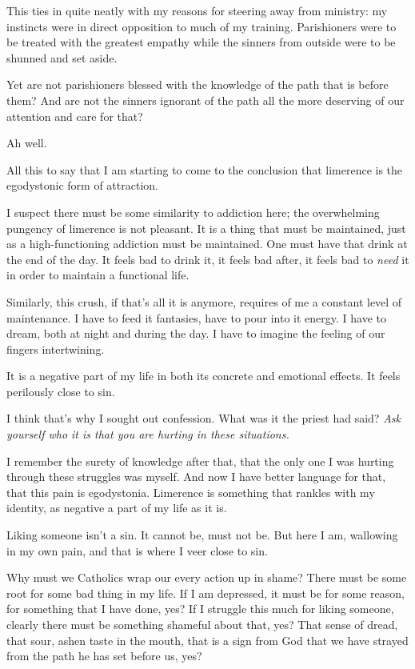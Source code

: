 This ties in quite neatly with my reasons for steering away from ministry: my instincts were in direct opposition to much of my training. Parishioners were to be treated with the greatest empathy while the sinners from outside were to be shunned and set aside.

Yet are not parishioners blessed with the knowledge of the path that is before them? And are not the sinners ignorant of the path all the more deserving of our attention and care for that?

Ah well.

All this to say that I am starting to come to the conclusion that limerence is the egodystonic form of attraction.

I suspect there must be some similarity to addiction here; the overwhelming pungency of limerence is not pleasant. It is a thing that must be maintained, just as a high-functioning addiction must be maintained. One must have that drink at the end of the day. It feels bad to drink it, it feels bad after, it feels bad to \emph{need} it in order to maintain a functional life.

Similarly, this crush, if that's all it is anymore, requires of me a constant level of maintenance. I have to feed it fantasies, have to pour into it energy. I have to dream, both at night and during the day. I have to imagine the feeling of our fingers intertwining.

It is a negative part of my life in both its concrete and emotional effects. It feels perilously close to sin.

I think that's why I sought out confession. What was it the priest had said? \emph{Ask yourself who it is that you are hurting in these situations.}

I remember the surety of knowledge after that, that the only one I was hurting through these struggles was myself. And now I have better language for that, that this pain is egodystonia. Limerence is something that rankles with my identity, as negative a part of my life as it is.

Liking someone isn't a sin. It cannot be, must not be. But here I am, wallowing in my own pain, and that is where I veer close to sin.

Why must we Catholics wrap our every action up in shame? There must be some root for some bad thing in my life. If I am depressed, it must be for some reason, for something that I have done, yes? If I struggle this much for liking someone, clearly there must be something shameful about that, yes? That sense of dread, that sour, ashen taste in the mouth, that is a sign from God that we have strayed from the path he has set before us, yes?

